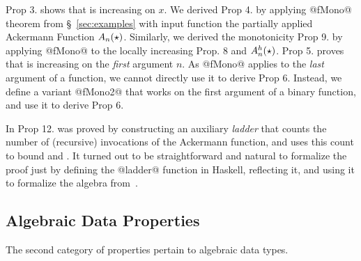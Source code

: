 %
Prop 3. shows that  is increasing on $x$.
%
We derived Prop 4. by applying @fMono@ theorem
from \S~\ref{sec:examples} with input function
the partially applied Ackermann Function
$A_{n}(\star)$.
%
Similarly, we derived the monotonicity Prop 9. by
applying @fMono@ to the locally increasing Prop. 8
and $A^{h}_{n}(\star)$.
%
Prop 5. proves that  is increasing
on the \emph{first} argument $n$.
%
As @fMono@ applies to the \emph{last} argument
of a function, we cannot directly use it to
derive Prop 6.
%
Instead, we define a variant @fMono2@ that works
on the first argument of a binary function, and
use it to derive Prop 6.


%
%
In \citep{ackermann} Prop 12. was proved by constructing
an auxiliary \emph{ladder} that counts the number of
(recursive) invocations of the Ackermann function, and
uses this count to bound  and .
%
It turned out to be straightforward and natural
to formalize the proof just by defining the
@ladder@ function in Haskell, reflecting it,
and using it to formalize the algebra from~\citep{ackermann}.

\subsection{Algebraic Data Properties}
\label{subsec:fold}

The second category of properties pertain to
algebraic data types.

